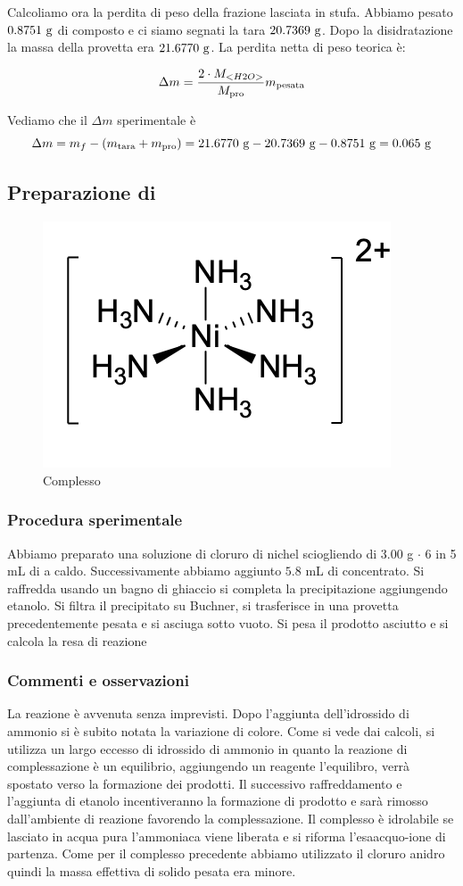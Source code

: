 Calcoliamo ora la perdita di peso della frazione lasciata in stufa. Abbiamo pesato $ 0.8751  \mathrm{\ g} $ di composto e ci siamo segnati la tara   $ 20.7369\mathrm{\ g}$. Dopo la disidratazione la massa della provetta era $ 21.6770 \mathrm{\ g}$. La perdita netta di peso teorica è: 

\[ \Delta m =\frac{ 2\cdot M_{<H2O>}}{M_{\text{pro}} } m_{\text{pesata}} \]

Vediamo che il $\Delta m$ sperimentale è 
\[ \Delta m = m_f -(m_{\text{tara}} +m_{\text{pro}}) = 21.6770 \mathrm{\ g} - 20.7369 \mathrm{\ g} - 0.8751   \mathrm{\ g} = 0.065\mathrm{\ g}\]
\subsection{Preparazione di {\ce{[Ni(NH3)6] }}}

\begin{figure}[ht!]
    \centering
    \includegraphics[width=0.3\linewidth]{foto/ninh3.png}
    \caption{Complesso \ce{[Ni(NH3)6] }}
    \label{fig:ninh3}
\end{figure}
\subsubsection{Procedura sperimentale}
Abbiamo preparato una soluzione di cloruro di nichel sciogliendo di $3.00$ g  $\cdot$ 6 
in 5 mL di  a caldo. Successivamente abbiamo aggiunto $5.8$ mL di  concentrato. Si raffredda usando un bagno di ghiaccio si completa la precipitazione aggiungendo etanolo. Si filtra il precipitato su Buchner, si trasferisce in una provetta precedentemente pesata e si asciuga sotto vuoto. Si pesa il prodotto asciutto e si calcola la resa di reazione
\subsubsection{Commenti e osservazioni}
La reazione è avvenuta senza imprevisti. Dopo l'aggiunta dell'idrossido di ammonio si è subito notata la variazione di colore. Come si vede dai calcoli, si utilizza un largo eccesso di idrossido di ammonio in quanto la reazione di complessazione è un equilibrio, aggiungendo un reagente l'equilibro, verrà spostato verso la formazione dei prodotti. Il successivo raffreddamento e l'aggiunta di etanolo incentiveranno la formazione di prodotto e sarà rimosso dall'ambiente di reazione favorendo la complessazione. Il complesso è idrolabile se lasciato in acqua pura l'ammoniaca viene liberata e si riforma l'esaacquo-ione di partenza. Come per il complesso precedente abbiamo utilizzato il cloruro anidro quindi la massa effettiva di solido pesata era minore.




